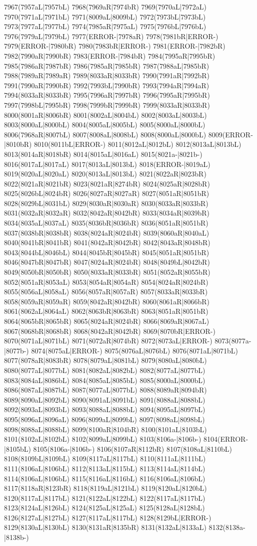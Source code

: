 7967(7957aL|7957bL) 7968(7969aR|7974bR) 7969(7970aL|7972aL) 7970(7971aL|7971bL) 7971(8009aL|8009bL) 7972(7973bL|7973bL) 7973(7977aL|7977bL) 7974(7985aR|7975aL) 7975(7976bL|7976bL) 7976(7979aL|7979bL) 7977(ERROR-|7978aR) 7978(7981bR|ERROR-) 7979(ERROR-|7980bR) 7980(7983bR|ERROR-) 7981(ERROR-|7982bR) 7982(7990aR|7990bR) 7983(ERROR-|7984bR) 7984(7995aR|7995bR) 7985(7986aR|7987bR) 7986(7985aR|7985bR) 7987(7988aL|7985bR) 7988(7989aR|7989aR) 7989(8033aR|8033bR) 7990(7991aR|7992bR) 7991(7990aR|7990bR) 7992(7993bL|7990bR) 7993(7994aR|7994aR) 7994(8033aR|8033bR) 7995(7996aR|7997bR) 7996(7995aR|7995bR) 7997(7998bL|7995bR) 7998(7999bR|7999bR) 7999(8033aR|8033bR) 8000(8001aR|8006bR) 8001(8002aL|8004bL) 8002(8003aL|8003bL) 8003(8000aL|8000bL) 8004(8005aL|8005bL) 8005(8000aL|8000bL) 8006(7968aR|8007bL) 8007(8008aL|8008bL) 8008(8000aL|8000bL) 8009(ERROR-|8010bR) 8010(8011bL|ERROR-) 8011(8012aL|8012bL) 8012(8013aL|8013bL) 8013(8014aR|8018bR) 8014(8015aL|8016aL) 8015(8021a-|8021b-) 8016(8017aL|8017aL) 8017(8013aL|8013bL) 8018(ERROR-|8019aL) 8019(8020aL|8020aL) 8020(8013aL|8013bL) 8021(8022aR|8023bR) 8022(8021aR|8021bR) 8023(8021aR|8274bR) 8024(8025aR|8028bR) 8025(8026bL|8024bR) 8026(8027aR|8027aR) 8027(8051aR|8051bR) 8028(8029bL|8031bL) 8029(8030aR|8030aR) 8030(8033aR|8033bR) 8031(8032aR|8032aR) 8032(8042aR|8042bR) 8033(8034aR|8039bR) 8034(8035aL|8037aL) 8035(8036bR|8036bR) 8036(8051aR|8051bR) 8037(8038bR|8038bR) 8038(8024aR|8024bR) 8039(8060aR|8040aL) 8040(8041bR|8041bR) 8041(8042aR|8042bR) 8042(8043aR|8048bR) 8043(8044bL|8046bL) 8044(8045bR|8045bR) 8045(8051aR|8051bR) 8046(8047bR|8047bR) 8047(8024aR|8024bR) 8048(8049bL|8042bR) 8049(8050bR|8050bR) 8050(8033aR|8033bR) 8051(8052aR|8055bR) 8052(8051aR|8053aL) 8053(8054aR|8054aR) 8054(8024aR|8024bR) 8055(8056aL|8058aL) 8056(8057aR|8057aR) 8057(8033aR|8033bR) 8058(8059aR|8059aR) 8059(8042aR|8042bR) 8060(8061aR|8066bR) 8061(8062aL|8064aL) 8062(8063bR|8063bR) 8063(8051aR|8051bR) 8064(8065bR|8065bR) 8065(8024aR|8024bR) 8066(8069aR|8067aL) 8067(8068bR|8068bR) 8068(8042aR|8042bR) 8069(8070bR|ERROR-) 8070(8071aL|8071bL) 8071(8072aR|8074bR) 8072(8073aL|ERROR-) 8073(8077a-|8077b-) 8074(8075aL|ERROR-) 8075(8076aL|8076bL) 8076(8071aL|8071bL) 8077(8078aR|8083bR) 8078(8079aL|8081bL) 8079(8080aL|8080bL) 8080(8077aL|8077bL) 8081(8082aL|8082bL) 8082(8077aL|8077bL) 8083(8084aL|8086bL) 8084(8085aL|8085bL) 8085(8000aL|8000bL) 8086(8087aL|8087bL) 8087(8077aL|8077bL) 8088(8089aR|8094bR) 8089(8090aL|8092bL) 8090(8091aL|8091bL) 8091(8088aL|8088bL) 8092(8093aL|8093bL) 8093(8088aL|8088bL) 8094(8095aL|8097bL) 8095(8096aL|8096aL) 8096(8099aL|8099bL) 8097(8098aL|8098bL) 8098(8088aL|8088bL) 8099(8100aR|8104bR) 8100(8101aL|8103bL) 8101(8102aL|8102bL) 8102(8099aL|8099bL) 8103(8106a-|8106b-) 8104(ERROR-|8105bL) 8105(8106a-|8106b-) 8106(8107aR|8112bR) 8107(8108aL|8110bL) 8108(8109bL|8109bL) 8109(8117aL|8117bL) 8110(8111aL|8111bL) 8111(8106aL|8106bL) 8112(8113aL|8115bL) 8113(8114aL|8114bL) 8114(8106aL|8106bL) 8115(8116aL|8116bL) 8116(8106aL|8106bL) 8117(8118aR|8123bR) 8118(8119aL|8121bL) 8119(8120aL|8120bL) 8120(8117aL|8117bL) 8121(8122aL|8122bL) 8122(8117aL|8117bL) 8123(8124aL|8126bL) 8124(8125aL|8125aL) 8125(8128aL|8128bL) 8126(8127aL|8127bL) 8127(8117aL|8117bL) 8128(8129bL|ERROR-) 8129(8130aL|8130bL) 8130(8131aR|8135bR) 8131(8132aL|8133aL) 8132(8138a-|8138b-) 